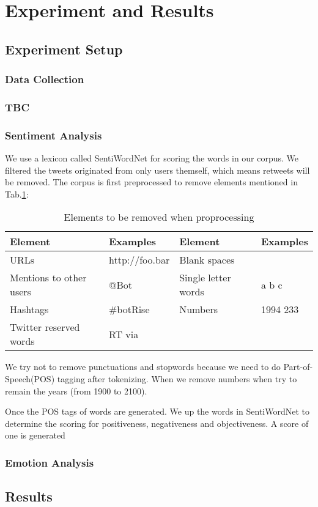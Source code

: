\section{Experiment and Results}

\subsection{Experiment Setup}

\subsubsection{Data Collection}

\subsubsection{TBC}

\subsubsection{Sentiment Analysis}

We use a lexicon called SentiWordNet for scoring the words in our corpus.
We filtered the tweets originated from only users themself, which means retweets will be removed.
The corpus is first preprocessed to remove elements mentioned in Tab.\ref{table:elementsRemoved}:

\begin{table}[h]
  \caption{Elements to be removed when proprocessing}
  \label{table:elementsRemoved}
  \centering
  \renewcommand{\tabularxcolumn}{m} %
  \begin{tabularx}{\textwidth}{l  l || l  l}
    \toprule
    \textbf{Element} & \textbf{Examples} & \textbf{Element}    & \textbf{Examples}
    \tabularnewline \midrule
    URLs
                     &
    http://foo.bar   & Blank spaces      &
    \tabularnewline \hline
    Mentions to other users
                     & @Bot              & Single letter words & a b c
    \tabularnewline \hline
    Hashtags
                     & \#botRise         & Numbers             & 1994 233
    \tabularnewline \hline
    Twitter reserved words
                     & RT via            &
                     &
    \tabularnewline \bottomrule
  \end{tabularx}
\end{table}

We try not to remove punctuations and stopwords because we need to do Part-of-Speech(POS) tagging after tokenizing. When we remove numbers when try to remain the years (from 1900 to 2100).

Once the POS tags of words are generated. We up the words in SentiWordNet to determine the scoring for positiveness, negativeness and objectiveness. A score of one is generated

\subsubsection{Emotion Analysis}

\subsection{Results}
